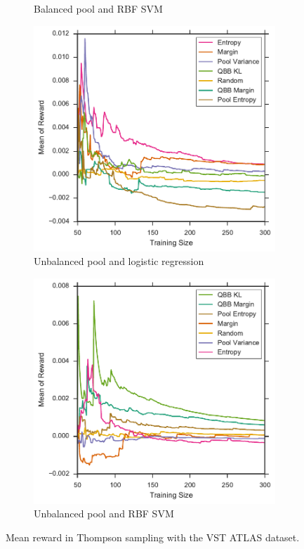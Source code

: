 \begin{figure}[p]
\begin{subfigure}{.5\textwidth}
		\caption{Balanced pool and RBF SVM}
		\label{fig:vstatlas_br_avg_rewards}
	\end{subfigure}
	\begin{subfigure}{.5\textwidth}
		\centering
		\includegraphics[width=\textwidth]{figures/5_thompson/vstatlas_ul_avg_rewards}
		\caption{Unbalanced pool and logistic regression}
		\label{fig:vstatlas_ul_avg_rewards}
	\end{subfigure}%
	\begin{subfigure}{.5\textwidth}
		\centering
		\includegraphics[width=\linewidth]{figures/5_thompson/vstatlas_ur_avg_rewards}
		\caption{Unbalanced pool and RBF SVM}
		\label{fig:vstatlas_ur_avg_rewards}
	\end{subfigure}
	\caption[Mean reward (average of 10 trials) of heuristics (VST ATLAS)]{
		Mean reward in Thompson sampling with the VST ATLAS dataset.}
	\label{fig:vstatlas_avg_rewards}
\end{figure}
